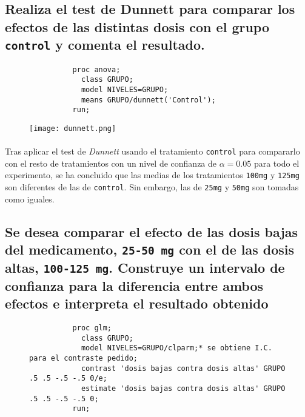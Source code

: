 \documentclass{article}
\begin{document}
    \subsection{Realiza el test de Dunnett para comparar los efectos de las distintas dosis con el grupo \texttt{control} y comenta el resultado.}

      \begin{figure}[h]
        \centering
        \begin{verbatim}
          proc anova;
            class GRUPO;
            model NIVELES=GRUPO;
            means GRUPO/dunnett('Control');
          run;
        \end{verbatim}
        \label{code:sas_6}
      \end{figure}

      \begin{figure}[H]
        \centering
        \texttt{[image: dunnett.png]}
      \end{figure}

      \paragraph{}
      Tras aplicar el test de \emph{Dunnett} usando el tratamiento \texttt{control} para compararlo con el resto de tratamientos con un nivel de confianza de $\alpha=0.05$ para todo el experimento, se ha concluido que las medias de los tratamientos \texttt{100mg} y \texttt{125mg} son diferentes de las de \texttt{control}. Sin embargo, las de \texttt{25mg} y \texttt{50mg} son tomadas como iguales.


    \subsection{Se desea comparar el efecto de las dosis bajas del medicamento, \texttt{25-50 mg} con el de las dosis altas, \texttt{100-125 mg}. Construye un intervalo de confianza para la diferencia entre ambos efectos e interpreta el resultado obtenido}

      \begin{figure}[h]
        \centering
        \begin{verbatim}
          proc glm;
            class GRUPO;
            model NIVELES=GRUPO/clparm;* se obtiene I.C. para el contraste pedido;
            contrast 'dosis bajas contra dosis altas' GRUPO .5 .5 -.5 -.5 0/e;
            estimate 'dosis bajas contra dosis altas' GRUPO .5 .5 -.5 -.5 0;
          run;
        \end{verbatim}
        \label{code:sas_7}
      \end{figure}
\end{document}
